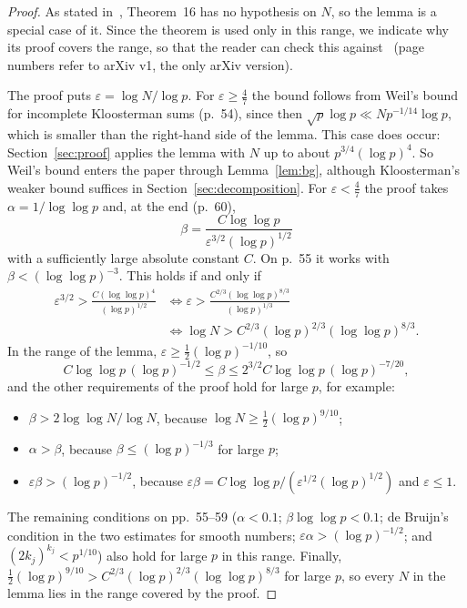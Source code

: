 \begin{proof}
As stated in~\cite{b8}, Theorem~16 has no hypothesis on $N$, so the lemma is a special case of it. Since the theorem is used only in this range, we indicate why its proof covers the range, so that the reader can check this against~\cite{b8} (page numbers refer to arXiv v1, the only arXiv version).

The proof puts $\varepsilon=\log N/\log p$. For $\varepsilon\ge\frac47$ the bound follows from Weil's bound for incomplete Kloosterman sums (p.~54), since then $\sqrt p\log p\ll Np^{-1/14}\log p$, which is smaller than the right-hand side of the lemma. This case does occur: Section~\ref{sec:proof} applies the lemma with $N$ up to about $p^{3/4}(\log p)^4$. So Weil's bound enters the paper through Lemma~\ref{lem:bg}, although Kloosterman's weaker bound suffices in Section~\ref{sec:decomposition}. For $\varepsilon<\frac47$ the proof takes $\alpha=1/\log\log p$ and, at the end (p.~60),
\[
\beta=\frac{C\log\log p}{\varepsilon^{3/2}(\log p)^{1/2}}
\]
with a sufficiently large absolute constant $C$. On p.~55 it works with $\beta<(\log\log p)^{-3}$. This holds if and only if
\begin{align*}
\varepsilon^{3/2}>\frac{C(\log\log p)^4}{(\log p)^{1/2}}
&\iff\varepsilon>\frac{C^{2/3}(\log\log p)^{8/3}}{(\log p)^{1/3}}\\
&\iff\log N>C^{2/3}(\log p)^{2/3}(\log\log p)^{8/3}.
\end{align*}
In the range of the lemma, $\varepsilon\ge\frac12(\log p)^{-1/10}$, so
\[
C\log\log p\,(\log p)^{-1/2}\le\beta\le2^{3/2}C\log\log p\,(\log p)^{-7/20},
\]
and the other requirements of the proof hold for large $p$, for example:
\begin{itemize}[leftmargin=2em]
\item $\beta>2\log\log N/\log N$, because $\log N\ge\frac12(\log p)^{9/10}$;
\item $\alpha>\beta$, because $\beta\le(\log p)^{-1/3}$ for large $p$;
\item $\varepsilon\beta>(\log p)^{-1/2}$, because $\varepsilon\beta=C\log\log p/(\varepsilon^{1/2}(\log p)^{1/2})$ and $\varepsilon\le1$.
\end{itemize}
The remaining conditions on pp.~55--59 ($\alpha<0.1$; $\beta\log\log p<0.1$; de Bruijn's condition in the two estimates for smooth numbers; $\varepsilon\alpha>(\log p)^{-1/2}$; and $(2k_j)^{k_j}<p^{1/10}$) also hold for large $p$ in this range.
Finally, $\frac12(\log p)^{9/10}>C^{2/3}(\log p)^{2/3}(\log\log p)^{8/3}$ for large $p$, so every $N$ in the lemma lies in the range covered by the proof.
\end{proof}

